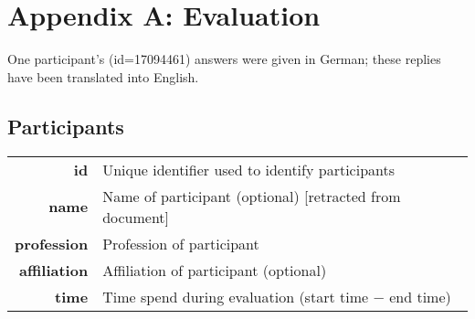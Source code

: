 \documentclass[8pt]{article}
\begin{document}
\small
%
% 
% 

\section*{Appendix A: Evaluation}

One participant's (id=17094461) answers were given in German; these replies have been translated into English.

\subsection*{Participants}

\begin{longtable}{r l}
\hline
\textbf{id} & Unique identifier used to identify participants\\
\textbf{name} & Name of participant (optional) [retracted from document] \\
\textbf{profession} & Profession of participant \\
\textbf{affiliation} & Affiliation of participant (optional) \\
\textbf{time} & Time spend during evaluation (start time $-$ end time) \\
\hline
\end{longtable}
\end{document}
